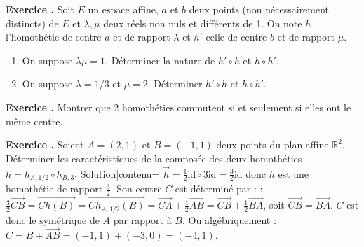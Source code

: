 \documentclass[10pt,a4paper]{article}
\def\bf#1{\textbf{#1}}
\newcounter{nexo}
\newcommand{\exo}{\medskip\noindent \bf{ Exercice \thenexo. \stepcounter{nexo}}}
\def\R{\mathbb{R}}
\begin{document}
\medskip

\exo 
Soit $E$ un espace affine, $a$ et $b$ deux points (non n\'ecessairement distincts) de $E$ et $\lambda, \mu$ deux r\'eels non nuls et diff\'erents de 1. On note $h$ l'homoth\'etie de centre $a$ et de rapport $\lambda$ et $h'$ celle de centre $b$ et de rapport $\mu$. 
\begin{enumerate}
\item On suppose $\lambda\mu=1$. D\'eterminer la nature de $h'\circ h$  et $h\circ h'$.
\item On suppose $\lambda=1/3$ et $\mu=2$. D\'eterminer  $h'\circ h$  et $h\circ h'$.
\end{enumerate}

\medskip

\exo
Montrer que 2 homoth\'eties commutent si et seulement si elles ont le m\^eme centre.

\exo
Soient $A=(2,1)$ et $B=(-1,1)$ deux points du plan affine $\R^2$. Déterminer les caractéristiques
de la composée des deux homothéties $h=h_{A,1/2}\circ h_{B,3}$.
{{Solution|contenu=
$\vec h=\frac12\mathrm{id}\circ3\mathrm{id}=\frac32\mathrm{id}$ donc $h$ est une homothétie de rapport $\frac32$. Son centre $C$ est déterminé par :
:$\frac32\overrightarrow{CB}=\overrightarrow{Ch(B)}=\overrightarrow{Ch_{A,1/2}(B)}=\overrightarrow{CA}+\frac12\overrightarrow{AB}=\overrightarrow{CB}+\frac12\overrightarrow{BA}$, soit $\overrightarrow{CB}=\overrightarrow{BA}$.
$C$ est donc le symétrique de $A$ par rapport à $B$. Ou algébriquement : $C=B+\overrightarrow{AB}=(-1,1)+(-3,0)=(-4,1)$.
}}
\end{document}
